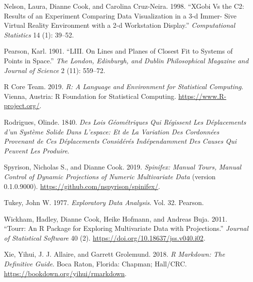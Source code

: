 \documentclass[
  11,
]{article}
\begin{document}
\leavevmode\hypertarget{ref-nelson_xgobi_1998}{}%
Nelson, Laura, Dianne Cook, and Carolina Cruz-Neira. 1998. ``XGobi Vs the C2: Results of an Experiment Comparing Data Visualization in a 3-d Immer- Sive Virtual Reality Environment with a 2-d Workstation Display.'' \emph{Computational Statistics} 14 (1): 39--52.

\leavevmode\hypertarget{ref-pearson_liii._1901}{}%
Pearson, Karl. 1901. ``LIII. On Lines and Planes of Closest Fit to Systems of Points in Space.'' \emph{The London, Edinburgh, and Dublin Philosophical Magazine and Journal of Science} 2 (11): 559--72.

\leavevmode\hypertarget{ref-r_core_team_r:_2019}{}%
R Core Team. 2019. \emph{R: A Language and Environment for Statistical Computing}. Vienna, Austria: R Foundation for Statistical Computing. \url{https://www.R-project.org/}.

\leavevmode\hypertarget{ref-rodrigues_lois_1840}{}%
Rodrigues, Olinde. 1840. \emph{Des Lois Géométriques Qui Régissent Les Déplacements d'un Système Solide Dans L'espace: Et de La Variation Des Cordonnées Provenant de Ces Déplacements Considérés Indépendamment Des Causes Qui Peuvent Les Produire}.

\leavevmode\hypertarget{ref-spyrison_spinifex_2019}{}%
Spyrison, Nicholas S., and Dianne Cook. 2019. \emph{Spinifex: Manual Tours, Manual Control of Dynamic Projections of Numeric Multivariate Data} (version 0.1.0.9000). \url{https://github.com/nspyrison/spinifex/}.

\leavevmode\hypertarget{ref-tukey_exploratory_1977}{}%
Tukey, John W. 1977. \emph{Exploratory Data Analysis}. Vol. 32. Pearson.

\leavevmode\hypertarget{ref-wickham_tourr:_2011}{}%
Wickham, Hadley, Dianne Cook, Heike Hofmann, and Andreas Buja. 2011. ``Tourr: An R Package for Exploring Multivariate Data with Projections.'' \emph{Journal of Statistical Software} 40 (2). \url{https://doi.org/10.18637/jss.v040.i02}.

\leavevmode\hypertarget{ref-xie_r_2018}{}%
Xie, Yihui, J. J. Allaire, and Garrett Grolemund. 2018. \emph{R Markdown: The Definitive Guide}. Boca Raton, Florida: Chapman; Hall/CRC. \url{https://bookdown.org/yihui/rmarkdown}.
\end{document}

